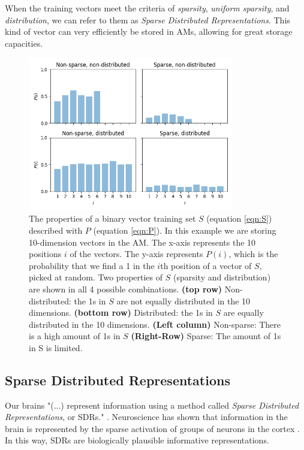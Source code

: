 \documentclass[runningheads]{llncs}
\begin{document}
When the training vectors meet the criteria of \textit{sparsity}, \textit{uniform sparsity}, and \textit{distribution}, we can refer to them as \textit{Sparse Distributed Representations}. This kind of vector can very efficiently be stored in AMs, allowing for great storage capacities.

\begin{figure}[h]
    \centering
    \includegraphics[width=0.8\textwidth]{img/sparse.png}
    \caption{The properties of a binary vector training set $S$ (equation \ref{eqn:S}) described with $P$ (equation \ref{eqn:P}). In this example we are storing 10-dimension vectors in the AM. The x-axis represents the 10 positions $i$ of the vectors. The y-axis represents $P(i)$, which is the probability that we find a 1 in the $i$th position of a vector of $S$, picked at random. Two properties of $S$ (sparsity and distribution) are shown in all 4 possible combinations. \textbf{(top row)} Non-distributed: the 1s in $S$ are not equally distributed in the 10 dimensions. \textbf{(bottom row)} Distributed: the 1s in $S$ are equally distributed in the 10 dimensions. \textbf{(Left column)} Non-sparse: There is a high amount of 1s in $S$ \textbf{(Right-Row)} Sparse: The amount of 1s in S is limited.}
    \label{fig:mesh1}
\label{fig:sparse}
\end{figure}
\subsection{Sparse Distributed Representations}
\label{sec:inputoutput_sdr}
Our brains "(...) represent information using a method called \textit{Sparse Distributed Representations}, or SDRs." \cite{Hawkins-et-al-2016-Book}. Neuroscience has shown that information in the brain is represented by the sparse activation of groups of neurons in the cortex \cite{olshausen1996emergence}. In this way, SDRs are biologically plausible informative representations.
\end{document}
